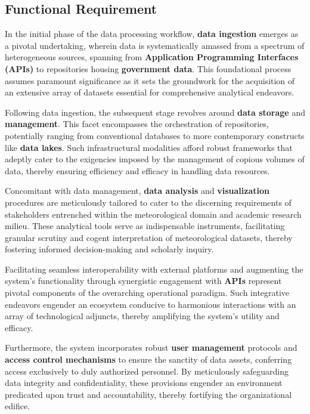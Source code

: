 \subsection{Functional Requirement}

In the initial phase of the data processing workflow, \textbf{data ingestion}
emerges as a pivotal undertaking, wherein data is systematically amassed from a
spectrum of heterogeneous sources, spanning from \textbf{Application Programming
    Interfaces (APIs)} to repositories housing \textbf{government data}. This
foundational process assumes paramount significance as it sets the groundwork
for the acquisition of an extensive array of datasets essential for
comprehensive analytical endeavors.

Following data ingestion, the subsequent stage revolves around \textbf{data
    storage} and \textbf{management}. This facet encompasses the orchestration of
repositories, potentially ranging from conventional databases to more
contemporary constructs like \textbf{data lakes}. Such infrastructural
modalities afford robust frameworks that adeptly cater to the exigencies imposed
by the management of copious volumes of data, thereby ensuring efficiency and
efficacy in handling data resources.

Concomitant with data management, \textbf{data analysis} and
\textbf{visualization} procedures are meticulously tailored to cater to the
discerning requirements of stakeholders entrenched within the meteorological
domain and academic research milieu. These analytical tools serve as
indispensable instruments, facilitating granular scrutiny and cogent
interpretation of meteorological datasets, thereby fostering informed
decision-making and scholarly inquiry.

Facilitating seamless interoperability with external platforms and augmenting
the system's functionality through synergistic engagement with \textbf{APIs}
represent pivotal components of the overarching operational paradigm. Such
integrative endeavors engender an ecosystem conducive to harmonious interactions
with an array of technological adjuncts, thereby amplifying the system's utility
and efficacy.

Furthermore, the system incorporates robust \textbf{user management} protocols
and \textbf{access control mechanisms} to ensure the sanctity of data assets,
conferring access exclusively to duly authorized personnel. By meticulously
safeguarding data integrity and confidentiality, these provisions engender an
environment predicated upon trust and accountability, thereby fortifying the
organizational edifice.

